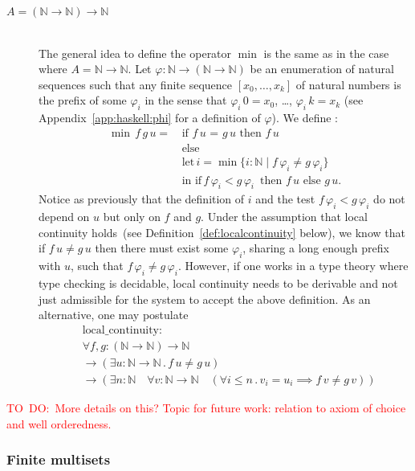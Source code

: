 \documentclass[envcountsame]{llncs}
\newcommand{\todo}[1]{\textcolor{red}{TO~DO:~#1}}
\newcommand{\N}{\mathbb{N}}
\begin{document}
\begin{description}
\bigskip
\item[$A=(\N\to\N)\to\N$] \hfill\\
The general idea to define the operator $\min$ is the same as in the case where $A=\N\to\N$. Let $\varphi : \N \to (\N\to\N)$ be an enumeration of natural sequences such that any finite sequence $[x_0,\dots,x_k]$ of
natural numbers is the prefix of some  $\varphi_i$ in the sense that $\varphi_i \,0 = x_0$, \dots, $\varphi_i\,k = x_k$ (see Appendix~\ref{app:haskell:phi} for a definition of $\varphi$).
We define :
\begin{align*}
 \min\,f\,g\,u =\,&\text{if $f \,u$ = $g\,u$ then $f\, u$}\\
                 &\text{else }\\
                 &\text{let}\,i = \min \{ i : \N\mid f\,\varphi_ i \not= g\,\varphi_ i \}\\
                 &\text{in }\text{if}\, f\,\varphi_ i< g\,\varphi_ i\,\text{ then } f\,u \text{ else } g\,u.
\end{align*}
Notice as previously that the definition of $i$ and the test $f\,\varphi_i < g\,\varphi_ i$ do not depend on $u$ but only on $f$ and $g$. Under the assumption that local continuity holds~(see Definition~\ref{def:localcontinuity} below), we know that if $f\,u\not=g\,u$ then there must exist some $\varphi_i$, sharing a long enough prefix with $u$, such that $f\,\varphi_ i \not= g\,\varphi_ i$. However, if one works in a type theory where type checking is decidable, local continuity needs to be derivable and not just admissible for the system to accept the above definition. As an alternative, one may  postulate
\begin{align*}
&\text{local\_continuity}:\\
&\forall f,g: (\N\to\N)\to\N\\
&\to(\exists u:\N\to\N\,.\,f\,u\neq g\,u)\\
&\to (\exists n:\N \quad \forall v:\N\to\N\quad(\forall i\leq n\,.\,v_i= u_i\implies f\,v\neq g\,v))
\end{align*}

\end{description}
\todo{More details on this? Topic for future work: relation to axiom of choice and well orderedness.}

\subsubsection*{Finite multisets}
\end{document}
